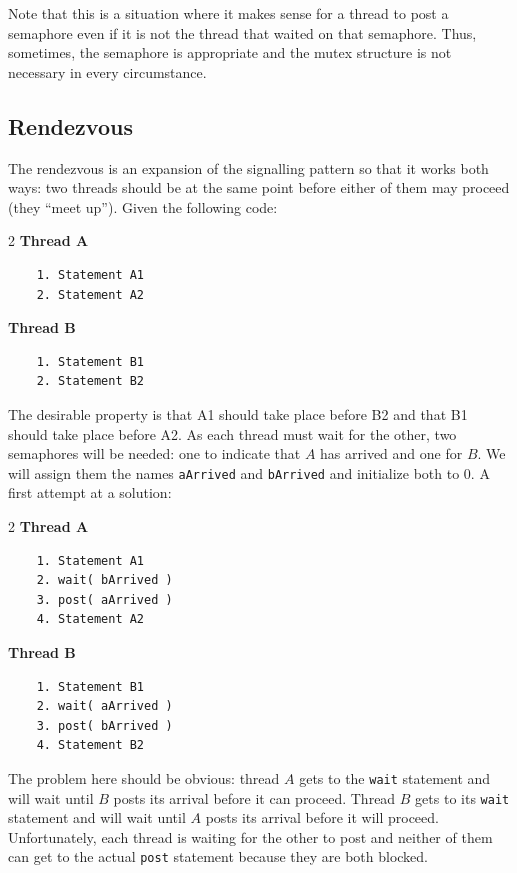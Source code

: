 Note that this is a situation where it makes sense for a thread to post a semaphore even if it is not the thread that waited on that semaphore. Thus, sometimes, the semaphore is appropriate and the mutex structure is not necessary in every circumstance.

\subsection*{Rendezvous}
The rendezvous is an expansion of the signalling pattern so that it works both ways: two threads should be at the same point before either of them may proceed (they ``meet up''). Given the following code:

\begin{multicols}{2}
	\textbf{Thread A}\vspace{-2em}
	\begin{verbatim}
	1. Statement A1
	2. Statement A2
  \end{verbatim}
	\columnbreak
	\textbf{Thread B}\vspace{-2em}
	\begin{verbatim}
	1. Statement B1
	2. Statement B2
  \end{verbatim}
\end{multicols}
\vspace{-2em}

The desirable property is that A1 should take place before B2 and that B1 should take place before A2. As each thread must wait for the other, two semaphores will be needed: one to indicate that $A$ has arrived and one for $B$. We will assign them the names \texttt{aArrived} and \texttt{bArrived} and initialize both to 0. A first attempt at a solution:

\begin{multicols}{2}
	\textbf{Thread A}\vspace{-2em}
	\begin{verbatim}
	1. Statement A1
	2. wait( bArrived )
	3. post( aArrived )
	4. Statement A2
  \end{verbatim}
	\columnbreak
	\textbf{Thread B}\vspace{-2em}
	\begin{verbatim}
	1. Statement B1
	2. wait( aArrived )
	3. post( bArrived )
	4. Statement B2
  \end{verbatim}
\end{multicols}
\vspace{-2em}


The problem here should be obvious: thread $A$ gets to the \texttt{wait} statement and will wait until $B$ posts its arrival before it can proceed. Thread $B$ gets to its \texttt{wait} statement and will wait until $A$ posts its arrival before it will proceed. Unfortunately, each thread is waiting for the other to post and neither of them can get to the actual \texttt{post} statement because they are both blocked.

